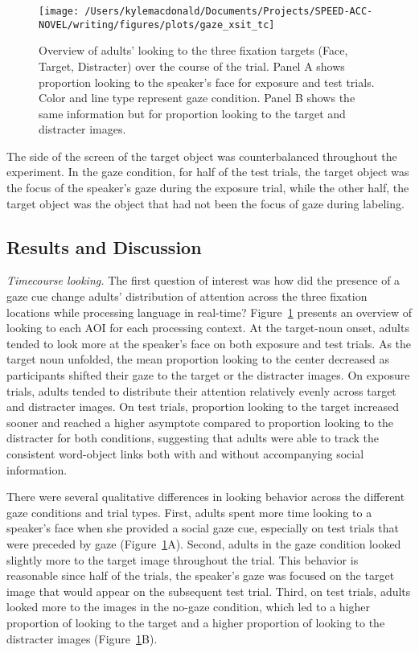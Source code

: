 \documentclass[man,floatsintext]{apa6}
\begin{document}
\begin{figure}[!t]

{\centering \texttt{[image: /Users/kylemacdonald/Documents/Projects/SPEED-ACC-NOVEL/writing/figures/plots/gaze\_xsit\_tc]} 

}

\caption{Overview of adults' looking to the three fixation targets (Face, Target, Distracter) over the course of the trial. Panel A shows proportion looking to the speaker's face for exposure and test trials. Color and line type represent gaze condition. Panel B shows the same information but for proportion looking to the target and distracter images.}\label{fig:gaze-xsit-tc-plot}
\end{figure}

The side of the screen of the target object was counterbalanced
throughout the experiment. In the gaze condition, for half of the test
trials, the target object was the focus of the speaker's gaze during the
exposure trial, while the other half, the target object was the object
that had not been the focus of gaze during labeling.

\subsection{Results and Discussion}\label{results-and-discussion-1}

\emph{Timecourse looking.} The first question of interest was how did
the presence of a gaze cue change adults' distribution of attention
across the three fixation locations while processing language in
real-time? Figure~\ref{fig:gaze-xsit-tc-plot} presents an overview of
looking to each AOI for each processing context. At the target-noun
onset, adults tended to look more at the speaker's face on both exposure
and test trials. As the target noun unfolded, the mean proportion
looking to the center decreased as participants shifted their gaze to
the target or the distracter images. On exposure trials, adults tended
to distribute their attention relatively evenly across target and
distracter images. On test trials, proportion looking to the target
increased sooner and reached a higher asymptote compared to proportion
looking to the distracter for both conditions, suggesting that adults
were able to track the consistent word-object links both with and
without accompanying social information.

There were several qualitative differences in looking behavior across
the different gaze conditions and trial types. First, adults spent more
time looking to a speaker's face when she provided a social gaze cue,
especially on test trials that were preceded by gaze
(Figure~\ref{fig:gaze-xsit-tc-plot}A). Second, adults in the gaze
condition looked slightly more to the target image throughout the trial.
This behavior is reasonable since half of the trials, the speaker's gaze
was focused on the target image that would appear on the subsequent test
trial. Third, on test trials, adults looked more to the images in the
no-gaze condition, which led to a higher proportion of looking to the
target and a higher proportion of looking to the distracter images
(Figure~\ref{fig:gaze-xsit-tc-plot}B).
\end{document}
